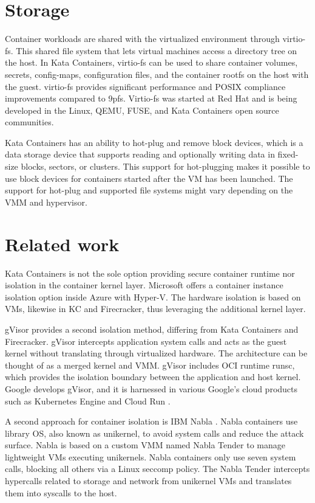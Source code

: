 \section{Storage}

Container workloads are shared with the virtualized environment through virtio-fs. This shared file system that lets virtual machines access a directory tree on the host. In Kata Containers, virtio-fs can be used to share container volumes, secrets, config-maps, configuration files, and the container rootfs on the host with the guest. virtio-fs provides significant performance and POSIX compliance improvements compared to 9pfs. Virtio-fs was started at Red Hat and is being developed in the Linux, QEMU, FUSE, and Kata Containers open source communities. \cite{virtio-fs} \cite{virtio-fs-Kata}

Kata Containers has an ability to hot-plug and remove block devices, which is a data storage device that supports reading and optionally writing data in fixed-size blocks, sectors, or clusters. This support for hot-plugging makes it possible to use block devices for containers started after the VM has been launched. The support for hot-plug and supported file systems  might vary depending on the VMM and hypervisor. \cite{KataContainersArchitecture} \cite{}

\section{Related work}

Kata Containers is not the sole option providing secure container runtime nor isolation in the container kernel layer. Microsoft offers a container instance isolation option inside Azure with Hyper-V. The hardware isolation is based on VMs, likewise in KC and Firecracker, thus leveraging the additional kernel layer. \cite{Hyper-V}

gVisor provides a second isolation method, differing from Kata Containers and Firecracker. gVisor intercepts application system calls and acts as the guest kernel without translating through virtualized hardware. The architecture can be thought of as a merged kernel and VMM. gVisor includes OCI runtime runsc, which provides the isolation boundary between the application and host kernel. Google develops gVisor, and it is harnessed in various Google's cloud products such as Kubernetes Engine \cite{GKE} and Cloud Run \cite{CloudRun}. \cite{Debab2021}\cite{gVisor}

A second approach for container isolation is IBM Nabla \cite{Nabla}. Nabla containers use library OS, also known as unikernel, to avoid system calls and reduce the attack surface. Nabla is based on a custom VMM named Nabla Tender to manage lightweight VMs executing unikernels. Nabla containers only use seven system calls, blocking all others via a Linux seccomp policy. The Nabla Tender intercepts hypercalls related to storage and network from unikernel VMs and translates them into syscalls to the host. \cite{Debab2021}

